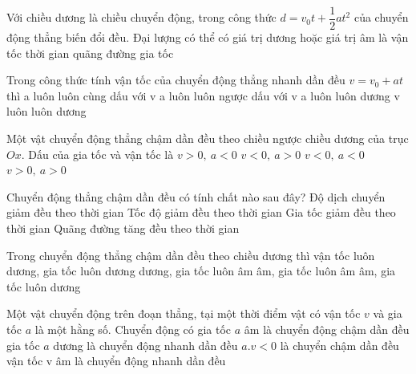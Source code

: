 \begin{ex}%
Với chiều dương là chiều chuyển động, trong công thức $d=v_0 t+\dfrac{1}{2} at^2$ của chuyển động thẳng biến đổi đều. Đại lượng có thể có giá trị dương hoặc giá trị âm là
\choice
{vận tốc}
{thời gian}
{quãng đường}
{\True gia tốc}
\loigiai{
}
 \end{ex}
\begin{ex}%
Trong công thức tính vận tốc của chuyển động thẳng nhanh dần đều $v=v_0+a t$ thì
\choice
{\True a luôn luôn cùng dấu với v}
{a luôn luôn ngược dấu với v}
{a luôn luôn dương}
{v luôn luôn dương}

 \end{ex}
\begin{ex}%
Một vật chuyển động thẳng chậm dần đều theo chiều ngược chiều dương của trục $Ox$. Dấu của gia tốc và vận tốc là
\choice
{$v>0,\ a<0$}
{\True $v<0,\ a>0$}
{$v<0,\ a<0$}
{$v>0,\ a>0$}

\loigiai{
}
 \end{ex}
\begin{ex}%
Chuyển động thẳng chậm dần đều có tính chất nào sau đây?
\choice
{Độ dịch chuyển giảm đều theo thời gian}
{\True Tốc độ giảm đều theo thời gian}
{Gia tốc giảm đều theo thời gian}
{Quãng đường tăng đều theo thời gian}

\loigiai{
}
\end{ex}
\begin{ex}%
Trong chuyển động thẳng chậm dần đều theo chiều dương thì vận tốc luôn
\choice
{dương, gia tốc luôn dương}
{\True dương, gia tốc luôn âm}
{âm, gia tốc luôn âm}
{âm, gia tốc luôn dương}	
\loigiai{
}
 \end{ex}

\begin{ex}%
Một vật chuyển động trên đoạn thẳng, tại một thời điểm vật có vận tốc $v$ và gia tốc $a$ là một hằng số. Chuyển động có
\choice
{gia tốc $a$ âm là chuyển động chậm dần đều}
{gia tốc $a$ dương là chuyển động nhanh dần đều}
{\True $a.v <0$ là chuyển chậm dần đều}
{vận tốc v âm là chuyển động nhanh dần đều}	
 \end{ex}
